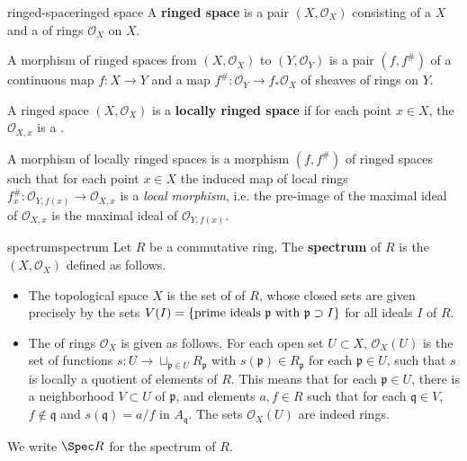 \begin{topic}{ringed-space}{ringed space}
    A \textbf{ringed space} is a pair $(X, \mathcal{O}_X)$ consisting of a  $X$ and a  of rings $\mathcal{O}_X$ on $X$.
    
    A morphism of ringed spaces from $(X, \mathcal{O}_X)$ to $(Y, \mathcal{O}_Y)$ is a pair $(f, f^\#)$ of a continuous map $f : X \to Y$ and a map $f^\# : \mathcal{O}_Y \to f_* \mathcal{O}_X$ of sheaves of rings on $Y$.
    
    A ringed space $(X, \mathcal{O}_X)$ is a \textbf{locally ringed space} if for each point $x \in X$, the  $\mathcal{O}_{X,x}$ is a .
    
    A morphism of locally ringed spaces is a morphism $(f, f^\#)$ of ringed spaces such that for each point $x \in X$ the induced map of local rings $f^\#_x : \mathcal{O}_{Y, f(x)} \to \mathcal{O}_{X, x}$ is a \textit{local morphism}, i.e. the pre-image of the maximal ideal of $\mathcal{O}_{X, x}$ is the maximal ideal of $\mathcal{O}_{Y, f(x)}$.
\end{topic}

\begin{topic}{spectrum}{spectrum}
    Let $R$ be a commutative ring. The \textbf{spectrum} of $R$ is the  $(X, \mathcal{O}_X)$ defined as follows.
    \begin{itemize}
        \item The topological space $X$ is the set of  of $R$, whose closed sets are given precisely by the sets $V(I) = \{ \textup{prime ideals } \mathfrak{p} \text{ with } \mathfrak{p} \supset I \}$ for all ideals $I$ of $R$.
        
        \item The  of rings $\mathcal{O}_X$ is given as follows. For each open set $U \subset X$, $\mathcal{O}_X(U)$ is the set of functions $s : U \to \sqcup_{\mathfrak{p} \in U} R_\mathfrak{p}$ with $s(\mathfrak{p}) \in R_\mathfrak{p}$ for each $\mathfrak{p} \in U$, such that $s$ is locally a quotient of elements of $R$. This means that for each $\mathfrak{p} \in U$, there is a neighborhood $V \subset U$ of $\mathfrak{p}$, and elements $a, f \in R$ such that for each $\mathfrak{q} \in V$, $f \not\in \mathfrak{q}$ and $s(\mathfrak{q}) = a/f$ in $A_\mathfrak{q}$. The sets $\mathcal{O}_X(U)$ are indeed rings.
    \end{itemize}
    We write $\Spec R$ for the spectrum of $R$.
\end{topic}

